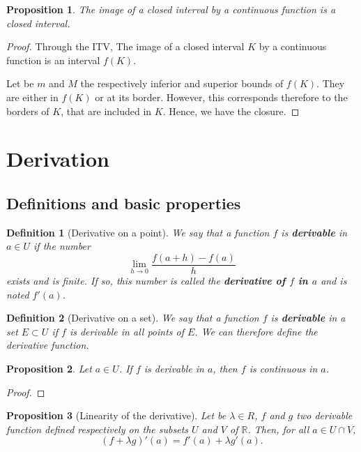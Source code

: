 \documentclass[french,12pt,a4paper]{book}
\newcommand{\R}{\mathbb{R}}
\newtheorem{defin}{Definition}[chapter]
\newtheorem{prop}{Proposition}[chapter]
\numberwithin{equation}{chapter}
\begin{document}
\begin{prop}
The image of a closed interval by a continuous function is a closed interval.
\end{prop}

\begin{proof}
Through the ITV, The image of a closed interval $K$ by a continuous function is an interval $f(K)$. 

Let be $m$ and $M$ the respectively inferior and superior bounds of $f(K)$. They are either in $f(K)$ or at its border. However, this corresponds therefore to the borders of $K$, that are included in $K$. Hence, we have the closure.

\end{proof}

\section{Derivation}

\subsection{Definitions and basic properties}

\begin{defin}[Derivative on a point]
We say that a function $f$ is \textbf{derivable} in $a \in U$ if the number
$$\lim_{h \rightarrow 0} \dfrac{f(a +h ) - f(a)}{h}$$
exists and is finite. If so, this number is called the \textbf{derivative of $f$ in $a$} and is noted $f'(a)$.
\end{defin}

\begin{defin}[Derivative on a set]
We say that a function $f$ is \textbf{derivable} in a set $E \subset U$ if $f$ is derivable in all points of $E$. We can therefore define the derivative function.
\end{defin}


\begin{prop}
Let $a \in U$. If $f$ is derivable in $a$, then $f$ is continuous in $a$. 
\end{prop}

\begin{proof}

\end{proof}

\begin{prop}[Linearity of the derivative]
Let be $\lambda \in R$, $f$ and $g$ two derivable function defined respectively on the subsets $U$ and $V$ of $\R$. Then, for all $a \in U \cap V$, 
$$(f+ \lambda g)'(a) = f'(a) + \lambda g'(a).$$
\end{prop}
\end{document}
